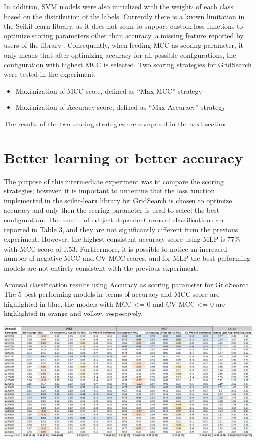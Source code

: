 In addition, \ac{SVM} models were also initialized with the weights of each class based on the distribution of the labels. Currently there is a known limitation in the Scikit-learn library, as it does not seem to support custom loss functions to optimize scoring parameters other than accuracy, a missing feature reported by users of the library \cite{martin_stacked_nodate, noauthor_please_nodate}. Consequently, when feeding \ac{MCC} as scoring parameter, it only means that after optimizing accuracy for all possible configurations, the configuration with highest \ac{MCC} is selected. Two scoring strategies for GridSearch were tested in the experiment:
\begin{itemize}
\item 	Maximization of \ac{MCC} score, defined as “Max MCC” strategy
\item 	Maximization of Accuracy score, defined as “Max Accuracy” strategy
\end{itemize}
The results of the two scoring strategies are compared in the next section.


\section{Better learning or better accuracy}
\label{sec:better_learning_accuracy}
The purpose of this intermediate experiment was to compare the scoring strategies; however, it is important to underline that the loss function implemented in the scikit-learn library for GridSearch is chosen to optimize accuracy and only then the scoring parameter is used to select the best configuration. The results of subject-dependent arousal classifications are reported in Table 3, and they are not significantly different from the previous experiment. However, the highest consistent accuracy score using \ac{MLP} is 77\% with \ac{MCC} score of 0.53. Furthermore, it is possible to notice an increased number of negative \ac{MCC} and \ac{CV MCC} scores, and for \ac{MLP} the best performing models are not entirely consistent with the previous experiment.

\begin{table}[h!]
  \caption{Arousal classification results using Accuracy as scoring parameter for GridSearch. The 5 best performing models in terms of accuracy and MCC score are highlighted in blue, the models with MCC <= 0 and CV MCC <= 0 are highlighted in orange and yellow, respectively.}
  \label{tbl:arousal_max_acc_results}
  \includegraphics[width=\linewidth]{img/results/arousal_max_acc_results.png}
\end{table}

